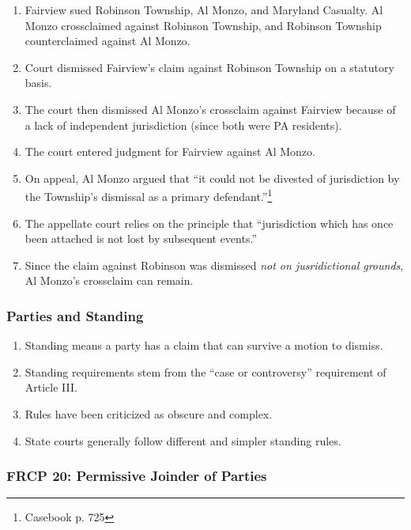 \begin{enumerate}
    \item Fairview sued Robinson Township, Al Monzo, and Maryland Casualty. Al 
    Monzo crossclaimed against Robinson Township, and Robinson Township 
    counterclaimed against Al Monzo.
    \item Court dismissed Fairview's claim against Robinson Township on a 
    statutory basis.
    \item The court then dismissed Al Monzo's crossclaim against Fairview 
    because of a lack of independent jurisdiction (since both were PA 
    residents).
    \item The court entered judgment for Fairview against Al Monzo.  \item On 
    appeal, Al Monzo argued that ``it could not be divested of jurisdiction by 
    the Township's dismissal as a primary defendant.''\footnote{Casebook p. 
    725} \item The appellate court relies on the principle that ``jurisdiction 
    which has once been attached is not lost by subsequent events.''
    \item Since the claim against Robinson was dismissed \emph{not on 
    jusridictional grounds}, Al Monzo's crossclaim can remain.
\end{enumerate}

\subsubsection{Parties and Standing}

\begin{enumerate}
    \item Standing means a party has a claim that can survive a motion to 
    dismiss.
    \item Standing requirements stem from the ``case or controversy'' 
    requirement of Article III.
    \item Rules have been criticized as obscure and complex.
    \item State courts generally follow different and simpler standing rules.
\end{enumerate}

\subsubsection{FRCP 20: Permissive Joinder of Parties}


